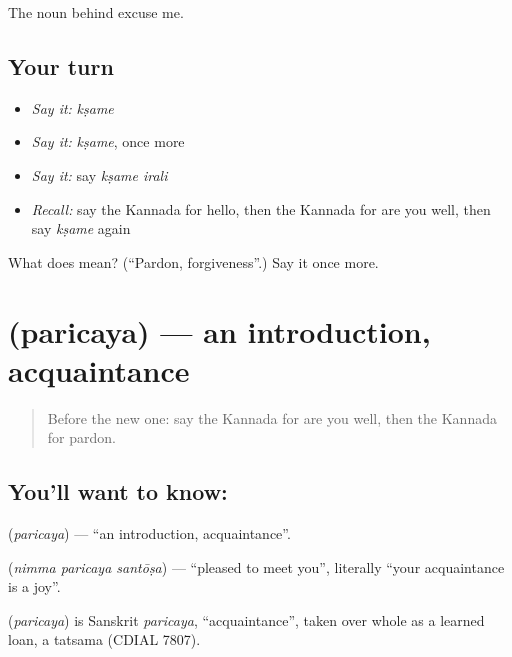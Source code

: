 \begin{grammarlens}[title={What you've built}]
The noun behind excuse me.
\end{grammarlens}

\subsection*{Your turn}
\begin{itemize}
\raggedright
  \item \emph{Say it:} \emph{kṣame}
  \item \emph{Say it:} \emph{kṣame}, once more
  \item \emph{Say it:} say \emph{kṣame irali}
  \item \emph{Recall:} say the Kannada for hello, then the Kannada for are you well, then say \emph{kṣame} again
\end{itemize}

\begin{tcolorbox}[breakable,colback=teal!4,colframe=teal!35!black,title={Before you move on}]
What does  mean? (\textquotedblleft{}Pardon, forgiveness\textquotedblright{}.) Say it once more.
\end{tcolorbox}
\section[\texorpdfstring{\kn{ಪರಿಚಯ} (paricaya)}{ಪರಿಚಯ (paricaya)}]{ (paricaya) — an introduction, acquaintance}

\label{lesson:KA-C97-introduction}



\begin{quote}
Before the new one: say the Kannada for are you well, then the Kannada for pardon.
\end{quote}

\subsection*{You'll want to know: }
\textbf{} (\emph{paricaya}) — \textquotedblleft{}an introduction, acquaintance\textquotedblright{}.

\textbf{  } (\emph{nimma paricaya santōṣa}) — \textquotedblleft{}pleased to meet you\textquotedblright{}, literally \textquotedblleft{}your acquaintance is a joy\textquotedblright{}.

\begin{cousinweb}
\textbf{} (\emph{paricaya}) is Sanskrit \emph{paricaya}, \textquotedblleft{}acquaintance\textquotedblright{}, taken over whole as a learned loan, a tatsama (CDIAL 7807).
\end{cousinweb}

